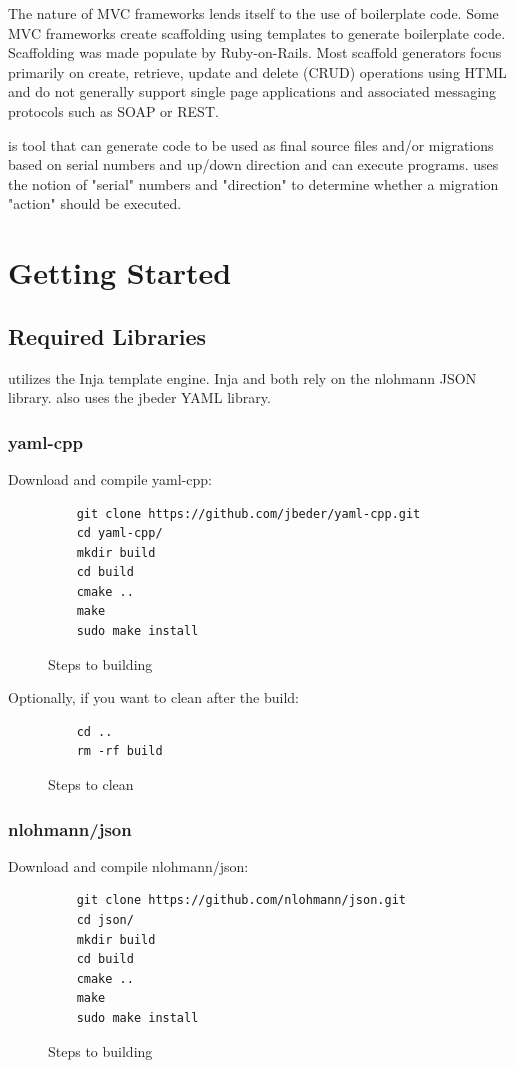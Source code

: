 \documentclass[]{article}
\begin{document}
The nature of MVC frameworks lends itself to the use of boilerplate code. Some MVC frameworks create scaffolding using templates to generate boilerplate code. Scaffolding was made populate by Ruby-on-Rails. Most scaffold generators focus primarily on create, retrieve, update and delete (CRUD) operations using HTML\cite{scaffold,vsscaffold} and do not generally support single page applications\cite{spa} and associated messaging protocols such as SOAP or REST.

 is tool that can generate code to be used as final source files and/or migrations based on serial numbers and up/down direction and can execute programs.  uses the notion of "serial" numbers and "direction" to determine whether a migration "action" should be executed.

\section{Getting Started}

\subsection{Required Libraries}
 utilizes the Inja\cite{inja} template engine. Inja and  both rely on the nlohmann JSON library\cite{nlohmann}.  also uses the jbeder YAML\cite{jbeder} library.

\subsubsection{yaml-cpp}
Download and compile yaml-cpp:
\begin{figure}[H]
	\begin{lstlisting}
	git clone https://github.com/jbeder/yaml-cpp.git
	cd yaml-cpp/
	mkdir build
	cd build
	cmake ..
	make
	sudo make install
	\end{lstlisting}
	\caption{Steps to building}
\end{figure}

Optionally, if you want to clean after the build:
\begin{figure}[H]
	\begin{lstlisting}
	cd ..
	rm -rf build
	\end{lstlisting}
	\caption{Steps to clean}
\end{figure}

\subsubsection{nlohmann/json}
Download and compile nlohmann/json:
\begin{figure}[H]
	\begin{lstlisting}
	git clone https://github.com/nlohmann/json.git
	cd json/
	mkdir build
	cd build
	cmake ..
	make
	sudo make install
	\end{lstlisting}
	\caption{Steps to building}
\end{figure}
\end{document}
